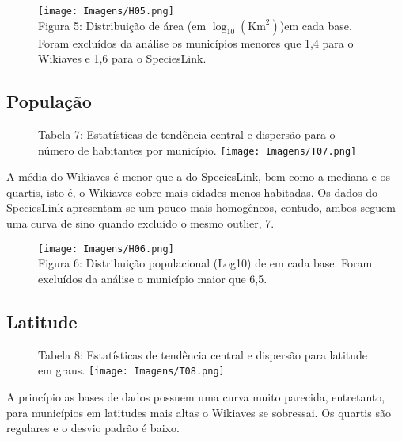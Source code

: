 \documentclass[12pt]{extarticle}
\newenvironment{resposta}{ \color{mygray}}{}
\begin{document}
\begin{figure}[h!]
\centering
\texttt{[image: Imagens/H05.png]}
\\{\scriptsize Figura 5: Distribuição de área (em $\log_{10}(\text{Km}^2)$)em cada base. Foram excluídos da análise os municípios menores que 1,4 para o Wikiaves e 1,6 para o SpeciesLink. }
\end{figure}

\newpage

\subsection{População}

\begin{figure}[h!]
\centering
{\scriptsize Tabela 7: Estatísticas de tendência central e dispersão para o número de habitantes por município.}
\texttt{[image: Imagens/T07.png]}
\end{figure}

\begin{resposta}
A média do Wikiaves é menor que a do SpeciesLink, bem como a mediana e os quartis, isto é, o Wikiaves cobre mais cidades menos habitadas. Os dados do SpeciesLink apresentam-se um pouco mais homogêneos, contudo, ambos seguem uma curva de sino quando excluído o mesmo outlier, 7.
\end{resposta}


\begin{figure}[h!]
\centering
\texttt{[image: Imagens/H06.png]}
\\{\scriptsize Figura 6: Distribuição populacional (Log10) de em cada base. Foram excluídos da análise o município maior que 6,5.}
\end{figure}

\newpage

\subsection{Latitude}

\begin{figure}[h!]
\centering
{\scriptsize Tabela 8: Estatísticas de tendência central e dispersão para latitude em graus.}
\texttt{[image: Imagens/T08.png]}
\end{figure}

\begin{resposta}
A princípio as bases de dados possuem uma curva muito parecida, entretanto, para municípios em latitudes mais altas o Wikiaves se sobressai. Os quartis são regulares e o desvio padrão é baixo. 
\end{resposta}
\end{document}
